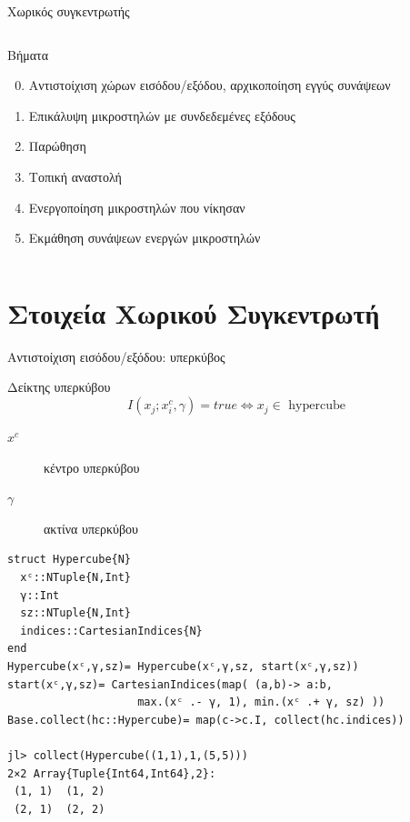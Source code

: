 \documentclass[10pt,lualatex]{beamer}
\begin{document}
\begin{frame}{Χωρικός συγκεντρωτής}
{\begin{columns}
\begin{block}{Βήματα}
\begin{enumerate}
        \setcounter{enumi}{-1}
        \item \alert<3>{Αντιστοίχιση χώρων εισόδου/εξόδου, αρχικοποίηση εγγύς συνάψεων}
        \item \alert<3>{Επικάλυψη μικροστηλών με συνδεδεμένες εξόδους}
        \item Παρώθηση
        \item Τοπική αναστολή
        \item Ενεργοποίηση μικροστηλών που νίκησαν
        \item \alert<3>{Εκμάθηση συνάψεων ενεργών μικροστηλών}
      \end{enumerate}
    \end{block}
  \end{columns}
  }
\end{frame}

\section{Στοιχεία Χωρικού Συγκεντρωτή}

\begin{frame}[fragile]{Αντιστοίχιση εισόδου/εξόδου: υπερκύβος}
\begin{block}{Δείκτης υπερκύβου}
  \[ I(x_j; x_i^c, γ) = \mathit{true} \iff x_j \in \text{ hypercube} \]
  \vspace{-2.2\topsep}
  \begin{description}
    \item[$x^c$] κέντρο υπερκύβου
    \item[$γ$] ακτίνα υπερκύβου
  \end{description}
\end{block}
\pause
\begin{verbatim}
struct Hypercube{N}
  xᶜ::NTuple{N,Int}
  γ::Int
  sz::NTuple{N,Int}
  indices::CartesianIndices{N}
end
Hypercube(xᶜ,γ,sz)= Hypercube(xᶜ,γ,sz, start(xᶜ,γ,sz))
start(xᶜ,γ,sz)= CartesianIndices(map( (a,b)-> a:b,
                    max.(xᶜ .- γ, 1), min.(xᶜ .+ γ, sz) ))
Base.collect(hc::Hypercube)= map(c->c.I, collect(hc.indices))

jl> collect(Hypercube((1,1),1,(5,5)))
2×2 Array{Tuple{Int64,Int64},2}:
 (1, 1)  (1, 2)
 (2, 1)  (2, 2)
\end{verbatim}
\end{frame}
\end{document}
